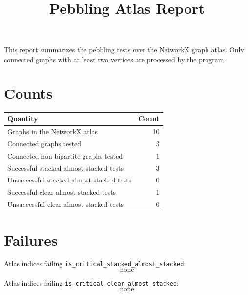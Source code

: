 \documentclass{amsart}
\title{Pebbling Atlas Report}
\author{}
\date{}
\begin{document}
\maketitle

This report summarizes the pebbling tests over the NetworkX graph atlas.
Only connected graphs with at least two vertices are processed by the program.

\section*{Counts}

\begin{center}
\begin{tabular}{lr}
\toprule
Quantity & Count \\
\midrule
Graphs in the NetworkX atlas & 10 \\
Connected graphs tested & 3 \\
Connected non-bipartite graphs tested & 1 \\
Successful stacked-almost-stacked tests & 3 \\
Unsuccessful stacked-almost-stacked tests & 0 \\
Successful clear-almost-stacked tests & 1 \\
Unsuccessful clear-almost-stacked tests & 0 \\
\bottomrule
\end{tabular}
\end{center}

\section*{Failures}

Atlas indices failing \texttt{is\_critical\_stacked\_almost\_stacked}:
\[
\text{none}
\]

Atlas indices failing \texttt{is\_critical\_clear\_almost\_stacked}:
\[
\text{none}
\]
\end{document}
